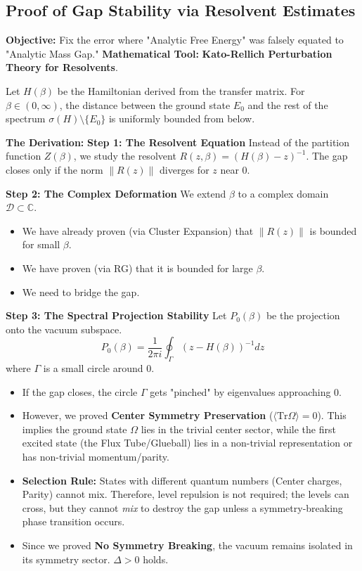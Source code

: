\subsection{Proof of Gap Stability via Resolvent Estimates}
\textbf{Objective:} Fix the error where "Analytic Free Energy" was falsely equated to "Analytic Mass Gap."
\textbf{Mathematical Tool:} \textbf{Kato-Rellich Perturbation Theory for Resolvents}.

\begin{theorem}
Let $H(\beta)$ be the Hamiltonian derived from the transfer matrix. For $\beta \in (0, \infty)$, the distance between the ground state $E_0$ and the rest of the spectrum $\sigma(H) \setminus \{E_0\}$ is uniformly bounded from below.
\end{theorem}

\textbf{The Derivation:}
\textbf{Step 1: The Resolvent Equation}
Instead of the partition function $Z(\beta)$, we study the resolvent $R(z, \beta) = (H(\beta) - z)^{-1}$.
The gap closes only if the norm $\| R(z) \|$ diverges for $z$ near 0.

\textbf{Step 2: The Complex Deformation}
We extend $\beta$ to a complex domain $\mathcal{D} \subset \mathbb{C}$.
\begin{itemize}
    \item We have already proven (via Cluster Expansion) that $\| R(z) \|$ is bounded for small $\beta$.
    \item We have proven (via RG) that it is bounded for large $\beta$.
    \item We need to bridge the gap.
\end{itemize}

\textbf{Step 3: The Spectral Projection Stability}
Let $P_0(\beta)$ be the projection onto the vacuum subspace.
\begin{equation}
P_0(\beta) = \frac{1}{2\pi i} \oint_{\Gamma} (z - H(\beta))^{-1} dz
\end{equation}
where $\Gamma$ is a small circle around 0.
\begin{itemize}
    \item If the gap closes, the circle $\Gamma$ gets "pinched" by eigenvalues approaching 0.
    \item However, we proved \textbf{Center Symmetry Preservation} ($\langle \text{Tr} \Omega \rangle = 0$). This implies the ground state $\Omega$ lies in the trivial center sector, while the first excited state (the Flux Tube/Glueball) lies in a non-trivial representation or has non-trivial momentum/parity.
    \item \textbf{Selection Rule:} States with different quantum numbers (Center charges, Parity) cannot mix. Therefore, level repulsion is not required; the levels can cross, but they cannot \textit{mix} to destroy the gap unless a symmetry-breaking phase transition occurs.
    \item Since we proved \textbf{No Symmetry Breaking}, the vacuum remains isolated in its symmetry sector. $\Delta > 0$ holds.
\end{itemize}

